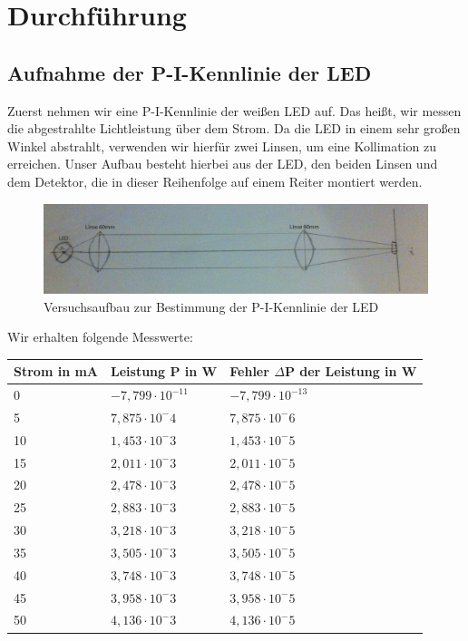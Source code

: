\documentclass[bigchapter,colorback,accentcolor=tud4b,linedtoc,11pt]{tudreport}
\begin{document}
\chapter{Durchführung}
\section{Aufnahme der P-I-Kennlinie der LED}
\label{sec:pikennlinie}
Zuerst nehmen wir eine P-I-Kennlinie der weißen LED auf. Das heißt, wir messen die abgestrahlte Lichtleistung über dem Strom. Da die LED in einem sehr großen Winkel abstrahlt, verwenden wir hierfür zwei Linsen, um eine Kollimation zu erreichen. Unser Aufbau besteht hierbei aus der LED, den beiden Linsen und dem Detektor, die in dieser Reihenfolge auf einem Reiter montiert werden.

\begin{figure}[ht!]
\centering
\includegraphics[width=150mm]{img/skizzen/versuch_a.jpg}
\caption{Versuchsaufbau zur Bestimmung der P-I-Kennlinie der LED}
\label{PI-Kennlinie-LED}
\end{figure}

Wir erhalten folgende Messwerte:

\begin{center}
  \begin{tabular}{|p{3.5cm}|p{4cm}|p{5cm}|}
    \hline
        Strom in mA & Leistung P in W & Fehler $\Delta$P der Leistung in W \\ \hline
        0 & $-7,799 \cdot 10^{-11}$ & $-7,799 \cdot 10^{-13}$ \\ \hline
        5 & $7,875 \cdot 10^-4$ & $7,875 \cdot 10^-6$ \\ \hline
        10 & $1,453 \cdot 10^-3$ & $1,453 \cdot 10^-5$ \\ \hline
        15 & $2,011 \cdot 10^-3$ & $2,011 \cdot 10^-5$ \\ \hline
        20 & $2,478 \cdot 10^-3$ & $2,478 \cdot 10^-5$ \\ \hline
        25 & $2,883 \cdot 10^-3$ & $2,883 \cdot 10^-5$ \\ \hline
        30 & $3,218 \cdot 10^-3$ & $3,218 \cdot 10^-5$ \\ \hline
        35 & $3,505 \cdot 10^-3$ & $3,505 \cdot 10^-5$ \\ \hline
        40 & $3,748 \cdot 10^-3$ & $3,748 \cdot 10^-5$ \\ \hline
        45 & $3,958 \cdot 10^-3$ & $3,958 \cdot 10^-5$ \\ \hline
        50 & $4,136 \cdot 10^-3$ & $4,136 \cdot 10^-5$ \\ \hline
	\end{tabular}
\end{center}
\end{document}
